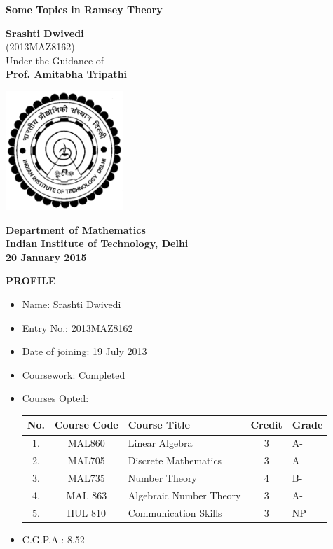 \documentclass[12pt]{report}
\begin{document}
\begin{center}
\LARGE{\textbf{Some Topics in Ramsey Theory}}\\
\vspace{1in}

\Large{\textbf{Srashti Dwivedi}} \\[5pt]
(2013MAZ8162)\\[10pt]
Under the Guidance of \\
\Large{\textbf{Prof. Amitabha Tripathi}}
\vspace{1in}

\begin{center}
\includegraphics[height=4.5cm]{iitd.jpeg}
\end{center}
\vspace{0.2cm}
\textbf{Department of Mathematics} \\
\textbf{Indian Institute of Technology, Delhi}\\
\textbf{20 January 2015}
\end{center}

\newpage

\begin{center}
\Large \bf PROFILE
\end{center}
\vspace{0.2in}

\begin{itemize}
\item
Name: Srashti Dwivedi
\item
Entry No.: 2013MAZ8162
\item
Date of joining: 19 July 2013
\item
Coursework: Completed
\item
Courses Opted:
\begin{center}
\begin{tabular}{|c|c|l|c|l|}\hline
No. & Course Code & Course Title & Credit & Grade \\ \hline
1. & MAL860 & Linear Algebra & 3 & A- \\ \hline
2. & MAL705 & Discrete Mathematics & 3  &A \\ \hline
3. & MAL735 & Number Theory & 4 & B- \\ \hline
4. & MAL 863 & Algebraic Number Theory & 3 & A- \\ \hline
5. & HUL 810 & Communication Skills & 3 & NP \\ \hline
\end{tabular}
\end{center}
\item
C.G.P.A.: 8.52
\end{itemize}
\end{document}
